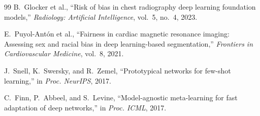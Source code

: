 \documentclass[10pt, twocolumn, letterpaper]{article}
\begin{document}
\begin{thebibliography}{99}
 B.~Glocker et al., ``Risk of bias in chest radiography deep learning foundation models,'' \textit{Radiology: Artificial Intelligence}, vol.~5, no.~4, 2023.

 E.~Puyol-Antón et al., ``Fairness in cardiac magnetic resonance imaging: Assessing sex and racial bias in deep learning-based segmentation,'' \textit{Frontiers in Cardiovascular Medicine}, vol.~8, 2021.

 J.~Snell, K.~Swersky, and R.~Zemel, ``Prototypical networks for few-shot learning,'' in \textit{Proc. NeurIPS}, 2017.

 C.~Finn, P.~Abbeel, and S.~Levine, ``Model-agnostic meta-learning for fast adaptation of deep networks,'' in \textit{Proc. ICML}, 2017.

\end{thebibliography}
\end{document}
